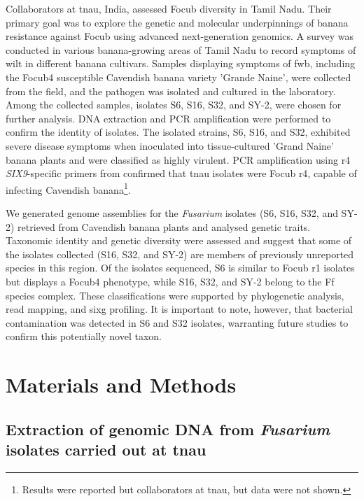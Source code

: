 Collaborators at \ac{tnau}, India, assessed \ac{Focub} diversity in Tamil Nadu. Their primary goal was to explore the genetic and molecular underpinnings of banana resistance against \ac{Focub} using advanced next-generation genomics. A survey was conducted in various banana-growing areas of Tamil Nadu to record symptoms of wilt in different banana cultivars. Samples displaying symptoms of \ac{fwb}, including the \ac{Focub4} susceptible Cavendish banana variety 'Grande Naine', were collected from the field, and the pathogen was isolated and cultured in the laboratory. Among the collected samples, isolates S6, S16, S32, and SY-2, were chosen for further analysis. DNA extraction and PCR amplification were performed to confirm the identity of isolates. The isolated strains, S6, S16, and S32, exhibited severe disease symptoms when inoculated into tissue-cultured 'Grand Naine' banana plants and were classified as highly virulent. PCR amplification using \ac{r4} \textit{SIX9}-specific primers from \textcite{Carvalhais2019} confirmed that \ac{tnau} isolates were \ac{Focub} \ac{r4}, capable of infecting Cavendish banana\footnote{Results were reported but collaborators at \ac{tnau}, but data were not shown.}.

We generated genome assemblies for the \textit{Fusarium} isolates  (S6, S16, S32, and SY-2) retrieved from Cavendish banana plants and analysed genetic traits. Taxonomic identity and genetic diversity were assessed and suggest that some of the isolates collected (S16, S32, and SY-2) are members of previously unreported species in this region. Of the isolates sequenced, S6 is similar to \ac{Focub} \ac{r1} isolates but displays a \ac{Focub4} phenotype, while S16, S32, and SY-2 belong to the \acl{Ff} species complex. These classifications were supported by phylogenetic analysis, read mapping, and \ac{sixg} profiling. It is important to note, however, that bacterial contamination was detected in S6 and S32 isolates, warranting future studies to confirm this potentially novel taxon.

\newpage
\section{Materials and Methods}


\subsection{Extraction of genomic DNA from \textit{Fusarium} isolates carried out at \acf{tnau}}

